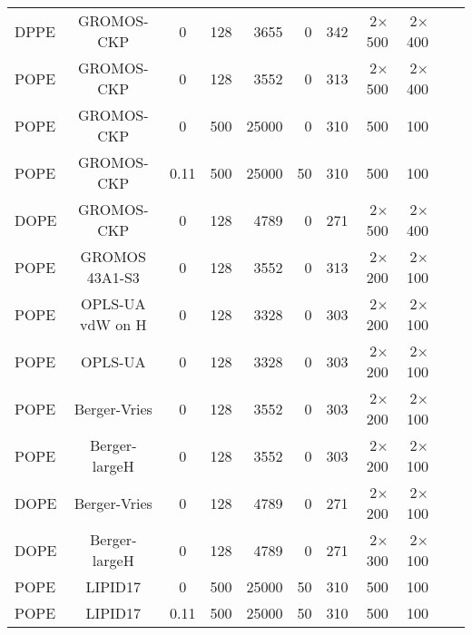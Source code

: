 \documentclass[aps,prl,superscriptaddress,twocolumn]{revtex4}
\begin{document}
\begin{table*}[htb]
\begin{minipage}[t]{\textwidth}
\begin{tabular}{l c c r r r r r r c c}
      \hline
      DPPE  & GROMOS-CKP    \cite{??}      &0    & 128	& 3655  &0    & 342  & 2$\times$500 & 2$\times$400 & \cite{gromosCKPdppe} \\
      POPE  & GROMOS-CKP    \cite{??}      &0    & 128	& 3552  &0    & 313  & 2$\times$500 & 2$\times$400 & \cite{gromosCKPpope} \\
      POPE  & GROMOS-CKP    \cite{??}      &0    & 500	& 25000 &0    & 310  & 500 & 100 & \cite{gromosCKPpopeT310} \\
      POPE  & GROMOS-CKP    \cite{??}      &0.11 & 500	& 25000 &50   & 310  & 500 & 100 & \cite{gromosCKPpopeT310150mMNaCl} \\
      DOPE  & GROMOS-CKP    \cite{??}      &0    & 128	& 4789  &0    & 271  & 2$\times$500 & 2$\times$400 & \cite{gromosCKPdope} \\
      \hline
      POPE  & GROMOS 43A1-S3 \cite{??}     &0    & 128	& 3552     &0    & 313  & 2$\times$200 & 2$\times$100 & \cite{gromos43a1s3POPEfiles}  \\
      \hline
      POPE  & OPLS-UA vdW on H \cite{??}   &0    & 128	& 3328     &0    & 303  & 2$\times$200 & 2$\times$100 & \cite{OPLSuaWvdWPOPEfiles} \\
      POPE  & OPLS-UA \cite{??}            &0    & 128	& 3328     &0    & 303  & 2$\times$200 & 2$\times$100 & \cite{OPLSuaPOPEfiles} \\
      \hline
      POPE  & Berger-Vries \cite{??}       &0    & 128	& 3552  &0    & 303  & 2$\times$200 & 2$\times$100 & \cite{bergerPOPEfiles}  \\
      POPE  & Berger-largeH \cite{??}      &0    & 128	& 3552  &0    & 303  & 2$\times$200 & 2$\times$100 & \cite{berger2POPEfiles}  \\
      DOPE  & Berger-Vries \cite{??}       &0    & 128	& 4789  &0    & 271  & 2$\times$200 & 2$\times$100 & \cite{bergerDOPEfiles}  \\
      DOPE  & Berger-largeH \cite{??}      &0    & 128	& 4789  &0    & 271  & 2$\times$300 & 2$\times$100 & \cite{berger2DOPEfiles} \\ 
      \hline
      POPE             & LIPID17 \cite{??} & 0      & 500 & 25000 & 50  &  310  & 500 & 100 & \cite{POPElipid17} \\
      POPE             & LIPID17 \cite{??} & 0.11   & 500 & 25000 & 50  &  310  & 500 & 100 & \cite{POPElipid17150mMNaCl} \\
    \end{tabular}
  \end{minipage}
\end{table*}
\end{document}
